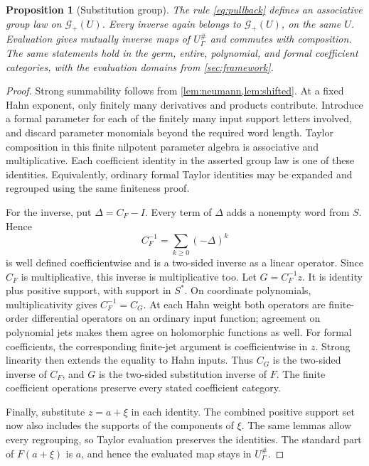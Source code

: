 \documentclass[11pt,letterpaper]{article}
\newtheorem{proposition}[proposition]{Proposition}
\theoremstyle{definition}
\theoremstyle{remark}
\newcommand{\GG}{\mathscr G}
\numberwithin{equation}{section}
\begin{document}
\begin{proposition}[Substitution group]\label{prop:subgroup}
The rule \eqref{eq:pullback} defines an associative group law on
$\GG_+(U)$. Every inverse again belongs to $\GG_+(U)$, on the same $U$.
Evaluation gives mutually inverse maps of $U_\Gamma^\#$ and commutes with
composition. The same statements hold in the germ, entire, polynomial, and
formal coefficient categories, with the evaluation domains from
\cref{sec:framework}.
\end{proposition}
\begin{proof}
Strong summability follows from \cref{lem:neumann,lem:shifted}. At a fixed
Hahn exponent, only finitely many derivatives and products contribute.
Introduce a formal parameter for each of the finitely many input support
letters involved, and discard parameter monomials beyond the required word
length. Taylor composition in this finite nilpotent parameter algebra is
associative and multiplicative. Each coefficient identity in the asserted
group law is one of these identities. Equivalently, ordinary formal Taylor
identities may be expanded and regrouped using the same finiteness proof.

For the inverse, put $\Delta=C_F-I$. Every term of $\Delta$ adds a nonempty
word from $S$. Hence
\[
 C_F^{-1}=\sum_{k\ge0}(-\Delta)^k
\]
is well defined coefficientwise and is a two-sided inverse as a linear
operator. Since $C_F$ is multiplicative, this inverse is multiplicative too.
Let $G=C_F^{-1}z$. It is identity plus positive support, with support in
$S^*$. On coordinate polynomials, multiplicativity gives $C_F^{-1}=C_G$.
At each Hahn weight both operators are finite-order differential operators
on an ordinary input function; agreement on polynomial jets makes them agree
on holomorphic functions as well. For formal coefficients, the corresponding
finite-jet argument is coefficientwise in $z$. Strong linearity then extends
the equality to Hahn inputs. Thus $C_G$ is the two-sided inverse of $C_F$,
and $G$ is the two-sided substitution inverse of $F$. The finite coefficient
operations preserve every stated coefficient category.

Finally, substitute $z=a+\xi$ in each identity. The combined positive support
set now also includes the supports of the components of $\xi$. The same
lemmas allow every regrouping, so Taylor evaluation preserves the identities.
The standard part of $F(a+\xi)$ is $a$, and hence the evaluated map stays in
$U_\Gamma^\#$.
\end{proof}
\end{document}
